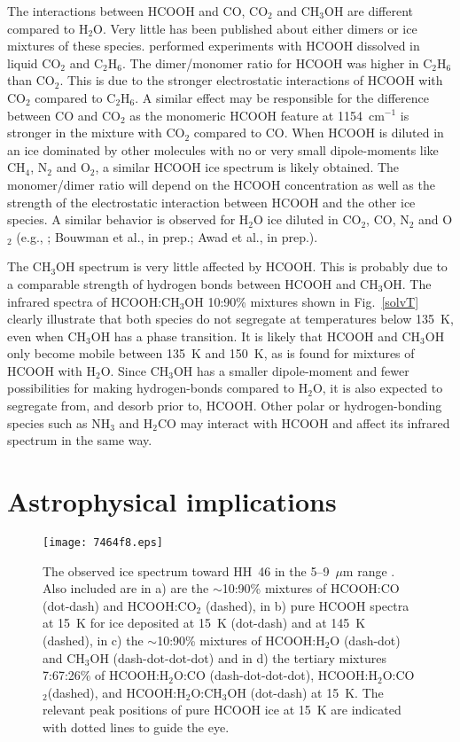 \documentclass{aa}
\begin{document}
The interactions between HCOOH and CO, CO$_2$ and CH$_3$OH are
different compared to H$_2$O. Very little has been published about
either dimers or ice mixtures of these species. \citet{park2002}
performed experiments with HCOOH dissolved in liquid CO$_2$ and
C$_2$H$_6$. The dimer/monomer ratio for HCOOH was higher in C$_2$H$_6$
than CO$_2$. This is due to the stronger electrostatic interactions of
HCOOH with CO$_2$ compared to C$_2$H$_6$.  A similar effect may be
responsible for the difference between CO and CO$_2$ as the monomeric
HCOOH feature at 1154~cm$^{-1}$ is stronger in the mixture with CO$_2$
compared to CO. When HCOOH is diluted in an ice dominated by other
molecules with no or very small dipole-moments like CH$_4$, N$_2$ and
O$_2$, a similar HCOOH ice spectrum is likely obtained. The
monomer/dimer ratio will depend on the HCOOH concentration as well as
the strength of the electrostatic interaction between HCOOH and the
other ice species. A similar behavior is observed for H$_2$O ice
diluted in CO$_2$, CO, N$_2$ and O$_2$ (e.g., \citealp{oberg2007};
Bouwman et al., in prep.; Awad et al., in prep.).

The CH$_3$OH spectrum is very little affected by HCOOH. This is
probably due to a comparable strength of hydrogen bonds between HCOOH
and CH$_3$OH. The infrared spectra of HCOOH:CH$_3$OH 10:90\% mixtures
shown in Fig.~\ref{solvT} clearly illustrate that both species do not
segregate at temperatures below 135~K, even when CH$_3$OH has a phase
transition. It is likely that HCOOH and CH$_3$OH only become mobile
between 135~K and 150~K, as is found for mixtures of HCOOH with
H$_2$O. Since CH$_3$OH has a smaller dipole-moment and fewer
possibilities for making hydrogen-bonds compared to H$_2$O, it is also
expected to segregate from, and desorb prior to, HCOOH. Other polar or
hydrogen-bonding species such as NH$_3$ and H$_2$CO may interact with
HCOOH and affect its infrared spectrum in the same way.

\section{Astrophysical implications}
\label{astro}

\begin{figure*}
\texttt{[image: 7464f8.eps]}
\caption{The observed ice spectrum toward HH~46 in the 5--9~$\mu$m
  range \citep{boogert2004}. Also included are in a) are the
  $\sim$10:90\% mixtures of HCOOH:CO (dot-dash) and HCOOH:CO$_2$
  (dashed), in b) pure HCOOH spectra at 15~K for ice deposited at 15~K
  (dot-dash) and at 145~K (dashed), in c) the $\sim$10:90\% mixtures
  of HCOOH:H$_2$O (dash-dot) and CH$_3$OH (dash-dot-dot-dot) and in d)
  the tertiary mixtures 7:67:26\% of HCOOH:H$_2$O:CO
  (dash-dot-dot-dot), HCOOH:H$_2$O:CO$_2$(dashed), and
  HCOOH:H$_2$O:CH$_3$OH (dot-dash) at 15~K. The relevant peak
  positions of pure HCOOH ice at 15~K are indicated with dotted lines
  to guide the eye.}\label{obsa}
\end{figure*}
\end{document}

